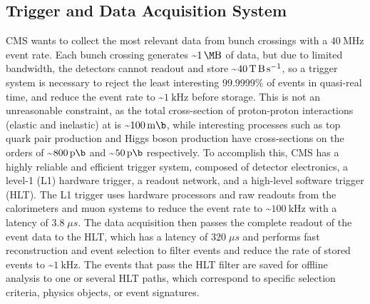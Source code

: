 \subsection{Trigger and Data Acquisition System}
CMS wants to collect the most relevant data from bunch crossings with a $\SI{40}{\MHz}$ event rate.
Each bunch crossing generates \sim$\SI{1}{\M \byte}$ of data, but due to limited bandwidth, the detectors cannot readout and store \sim$\SI{40}{\T \byte \per \s}$, so a trigger system is necessary to reject the least interesting 99.9999\% of events in quasi-real time, and reduce the event rate to \sim$\SI{1}{\kilo \Hz}$ before storage.
This is not an unreasonable constraint, as the total cross-section of proton-proton interactions (elastic and inelastic) at \beamenergy is \sim$\SI{100}{\milli \b}$, while interesting processes such as top quark pair production and Higgs boson production have cross-sections on the orders of \sim$\SI{800}{\pico \b}$ and \sim$\SI{50}{\pico \b}$ respectively.
To accomplish this, CMS has a highly reliable and efficient trigger system, composed of detector electronics, a level-1 (L1) hardware trigger, a readout network, and a high-level software trigger (HLT).
The L1 trigger uses hardware processors and raw readouts from the calorimeters and muon systems to reduce the event rate to \sim$\SI{100}{\kHz}$ with a latency of $3.8 \; \mu s$.
The data acquisition then passes the complete readout of the event data to the HLT, which has a latency of $320 \; \mu s$ and performs fast reconstruction and event selection to filter events and reduce the rate of stored events to \sim$\SI{1}{\kilo \Hz}$.
The events that pass the HLT filter are saved for offline analysis to one or several HLT paths, which correspond to specific selection criteria, physics objects, or event signatures.



